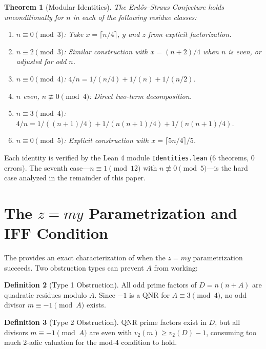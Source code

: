 \documentclass[11pt,a4paper]{article}
\theoremstyle{plain}
\newtheorem{theorem}{Theorem}[section]
\theoremstyle{plain}
\theoremstyle{definition}
\newtheorem{definition}[theorem]{Definition}
\numberwithin{equation}{section}
\begin{document}
\begin{theorem}[Modular Identities]
The Erd\H{o}s--Straus Conjecture holds unconditionally for $n$ in each of the following residue classes:
\begin{enumerate}[noitemsep]
  \item $n \equiv 0 \pmod{3}$: Take $x = \lceil n/4 \rceil$, $y$ and $z$ from explicit factorization.
  \item $n \equiv 2 \pmod{3}$: Similar construction with $x = (n+2)/4$ when $n$ is even, or adjusted for odd $n$.
  \item $n \equiv 0 \pmod{4}$: $4/n = 1/(n/4) + 1/(n) + 1/(n/2)$.
  \item $n$ even, $n \not\equiv 0 \pmod{4}$: Direct two-term decomposition.
  \item $n \equiv 3 \pmod{4}$: $4/n = 1/((n+1)/4) + 1/(n(n+1)/4) + 1/(n(n+1)/4)$.
  \item $n \equiv 0 \pmod{5}$: Explicit construction with $x = \lceil 5n/4 \rceil / 5$.
\end{enumerate}
\end{theorem}

Each identity is verified by the Lean 4 module \texttt{Identities.lean} (6 theorems, 0 errors). The seventh case---$n \equiv 1 \pmod{12}$ with $n \not\equiv 0 \pmod{5}$---is the hard case analyzed in the remainder of this paper.

\section{The \texorpdfstring{$z = my$}{z=my} Parametrization and IFF Condition}

The  provides an exact characterization of when the $z = my$ parametrization succeeds. Two obstruction types can prevent $A$ from working:

\begin{definition}[Type 1 Obstruction]
All odd prime factors of $D = n(n+A)$ are quadratic residues modulo $A$. Since $-1$ is a QNR for $A \equiv 3 \pmod{4}$, no odd divisor $m \equiv -1 \pmod{A}$ exists.
\end{definition}

\begin{definition}[Type 2 Obstruction]
QNR prime factors exist in $D$, but all divisors $m \equiv -1 \pmod{A}$ are even with $v_2(m) \geq v_2(D) - 1$, consuming too much 2-adic valuation for the mod-4 condition to hold.
\end{definition}
\end{document}
